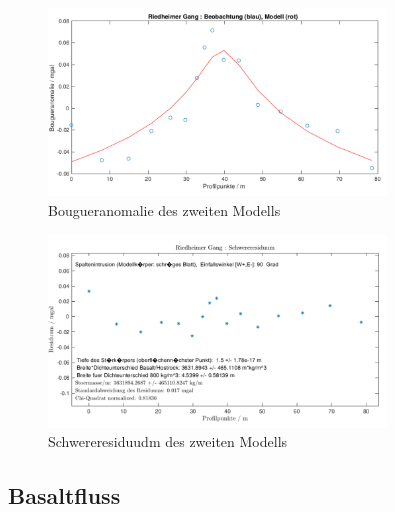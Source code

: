 \begin{figure}[!ht]
 \centering
 \includegraphics[width=0.8\textwidth]{fig/modell2}
 \caption{Bougueranomalie des zweiten Modells}
 \label{fig:modell2}
\end{figure}

\begin{figure}[!ht]
 \centering
 \includegraphics[width=0.8\textwidth]{fig/modell2_res}
 \caption{Schwereresiduudm des zweiten Modells}
 \label{fig:modell2_res}
\end{figure}

\subsection{Basaltfluss}



